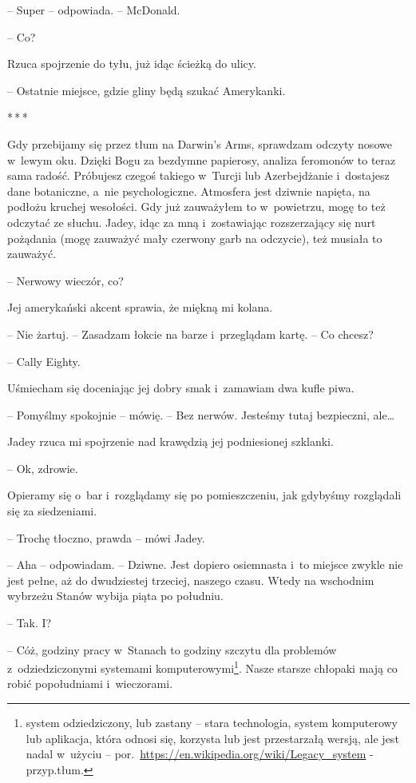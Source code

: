 \documentclass[oneside,polish,12pt,sfheadings]{mwbk}
\newcommand{\threeast}{\bigskip\par\centerline{*\,*\,*}\medskip\par}%
\begin{document}
-- Super -- odpowiada. -- McDonald.

-- Co?

Rzuca spojrzenie do tyłu, już idąc ścieżką do ulicy.

-- Ostatnie miejsce, gdzie gliny będą szukać Amerykanki.

\threeast

Gdy przebijamy się przez tłum na Darwin's Arms, sprawdzam odczyty nosowe
w~lewym oku. Dzięki Bogu za bezdymne papierosy, analiza feromonów to
teraz sama radość. Próbujesz czegoś takiego w~Turcji lub Azerbejdżanie i~dostajesz dane botaniczne, a~nie psychologiczne. Atmosfera jest dziwnie
napięta, na podłożu kruchej wesołości. Gdy już zauważyłem to w~powietrzu, mogę to też odczytać ze słuchu. Jadey, idąc za mną i~zostawiając rozszerzający się nurt pożądania (mogę zauważyć mały
czerwony garb na odczycie), też musiała to zauważyć.

-- Nerwowy wieczór, co?

Jej amerykański akcent sprawia, że miękną mi kolana.

-- Nie żartuj. -- Zasadzam łokcie na barze i~przeglądam kartę. -- Co
chcesz?

-- Cally Eighty.

Uśmiecham się doceniając jej dobry smak i~zamawiam dwa kufle piwa. 

-- Pomyślmy spokojnie -- mówię. -- Bez nerwów. Jesteśmy tutaj bezpieczni,
ale\ldots

Jadey rzuca mi spojrzenie nad krawędzią jej podniesionej szklanki. 

-- Ok,
zdrowie.

Opieramy się o~bar i~rozglądamy się po pomieszczeniu, jak gdybyśmy
rozglądali się za siedzeniami.

-- Trochę tłoczno, prawda -- mówi Jadey.

-- Aha -- odpowiadam. -- Dziwne. Jest dopiero osiemnasta i~to miejsce
zwykle nie jest pełne, aż do dwudziestej trzeciej, naszego czasu. Wtedy
na wschodnim wybrzeżu Stanów wybija piąta po południu.

-- Tak. I?

-- Cóż, godziny pracy w~Stanach to godziny szczytu dla problemów z~odziedziczonymi systemami komputerowymi\footnote{system
odziedziczony, lub zastany -- stara technologia, system komputerowy lub
aplikacja, która odnosi się, korzysta lub jest przestarzałą wersją, ale
jest nadal w~użyciu -- por.~\url{https://en.wikipedia.org/wiki/Legacy\_system} - przyp.tłum.}. Nasze starsze chłopaki mają co robić popołudniami i~wieczorami.
\end{document}
